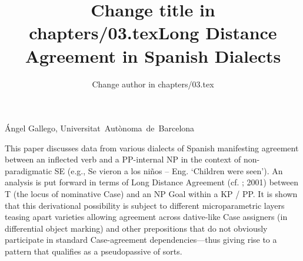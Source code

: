 \documentclass[output=paper]{langsci/langscibook}
\author{Change author in chapters/03.tex}
\title{Change title in chapters/03.tex}
\begin{document}
\title{Long Distance Agreement in Spanish Dialects}

 

 

 

 

 

 

 

 

 

 

 

Ángel Gallego, Universitat~Autònoma~de~Barcelona

\begin{stylelsAbstract}
This paper discusses data from various dialects of Spanish manifesting agreement between an inflected verb and a PP-internal NP in the context of non-paradigmatic SE (e.g., Se vieron a los niños – Eng. ‘Children were seen’). An analysis is put forward in terms of Long Distance Agreement (cf. \citealt{Chomsky2000}; 2001) between T (the locus of nominative Case) and an NP Goal within a KP / PP. It is shown that this derivational possibility is subject to different microparametric layers teasing apart varieties allowing agreement across dative-like Case assigners (in differential object marking) and other prepositions that do not obviously participate in standard Case-agreement dependencies—thus giving rise to a pattern that qualifies as a pseudopassive of sorts.
\end{stylelsAbstract}
\end{document}

